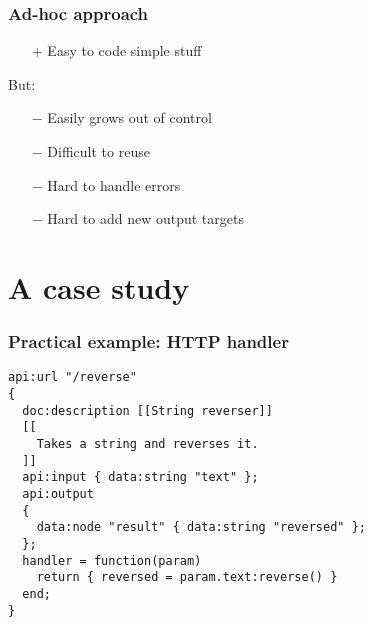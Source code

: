 \documentclass[handout]{beamer}
\begin{document}
\begin{frame}

\frametitle{Ad-hoc approach}

\begin{itemize}
\item[+] Easy to code simple stuff
\end{itemize}

But:

\begin{itemize}
\item[$-$] Easily grows out of control
\item[$-$] Difficult to reuse
\item[$-$] Hard to handle errors
\item[$-$] Hard to add new output targets
\end{itemize}

\end{frame}


\section{A case study}


\begin{frame}[fragile]

\frametitle{Practical example: HTTP handler}

\begin{verbatim}
api:url "/reverse"
{
  doc:description [[String reverser]]
  [[
    Takes a string and reverses it.
  ]]
  api:input { data:string "text" };
  api:output
  {
    data:node "result" { data:string "reversed" };
  };
  handler = function(param)
    return { reversed = param.text:reverse() }
  end;
}
\end{verbatim}

\end{frame}

\end{document}
